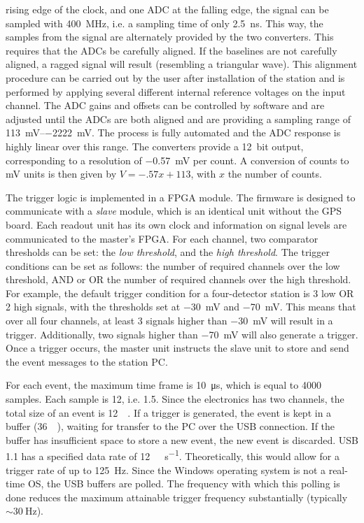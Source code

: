 rising edge of the clock, and one ADC at the falling edge, the signal can be
sampled with \SI{400}{\mega\hertz}, i.e. a sampling time of only
\SI{2.5}{\nano\second}. This way, the samples from the signal are alternately
provided by the two converters. This requires that the ADCs be carefully
aligned. If the baselines are not carefully aligned, a ragged signal will result
(resembling a triangular wave). This alignment procedure can be carried out by
the user after installation of the station and is performed by applying several
different internal reference voltages on the input channel.  The ADC gains and
offsets can be controlled by software and are adjusted until the ADCs are both
aligned and are providing a sampling range of
\SIrange[retain-explicit-plus]{+113}{-2222}{\milli\volt}. The process is fully
automated and the ADC response is highly linear over this range. The converters
provide a \SI{12}{bit} output, corresponding to a resolution of
\SI{-.57}{\milli\volt} per \adc count.  A conversion of \adc counts to \si{\milli\volt} units is
then given by $V = -.57x + 113$, with $x$ the number of \adc counts.

The trigger logic is implemented in a FPGA module. The firmware is designed to
communicate with a \emph{slave} module, which is an identical \hisparcii
unit without the GPS board. Each readout unit has its own clock and
information on signal levels are communicated to the master's FPGA. For each
channel, two comparator thresholds can be set: the \emph{low threshold}, and the
\emph{high threshold}. The trigger conditions can be set as follows: the number
of required channels over the low threshold, AND or OR the number of required
channels over the high threshold. For example, the default trigger condition
for a four-detector station is 3 low OR 2 high signals, with the
thresholds set at \SI{-30}{\milli\volt} and \SI{-70}{\milli\volt}. This means that over all four channels, at least 3
signals higher than \SI{-30}{\milli\volt} will result in a trigger.
Additionally, two signals higher than \SI{-70}{\milli\volt} will also generate a
trigger. Once a trigger occurs, the master unit instructs the slave unit to
store and send the event messages to the station PC.

For each event, the maximum time frame is \SI{10}{\micro\second}, which is equal
to \num{4000} samples.  Each sample is \SI{12}{\bit}, i.e.
\SI{1.5}{\byte}.  Since the electronics has two channels, the total size of an
event is \SI{12}{\kilo\byte}.  If a trigger is generated, the event is kept in a
buffer (\SI{36}{\kilo\byte}),
waiting for transfer to the PC over the USB connection.  If the buffer has
insufficient space to store a new event, the new event is discarded.  USB 1.1
has a specified data rate of \SI{12}{\mega\bit\per\second}. Theoretically, this
would allow for a trigger rate of up to \SI{125}{\hertz}. Since the Windows
operating system is not a real-time OS, the USB buffers are polled. The
frequency with which this polling is done reduces the maximum attainable trigger
frequency substantially (typically $\sim \SI{30}{\hertz}$).

